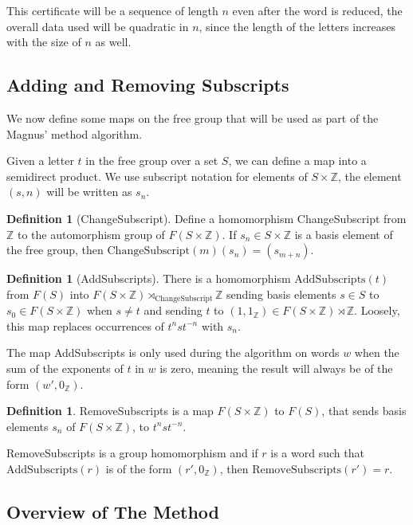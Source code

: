 \documentclass[12pt]{article} %
\theoremstyle{definition}
\theoremstyle{definition}
\theoremstyle{definition}
\theoremstyle{definition}
\newtheorem{defn}[thm]{Definition}
\begin{document}
This certificate will be a sequence of length $n$ even after the word is reduced,
the overall data used will be quadratic in $n$, since the length of the letters
increases with the size of $n$ as well.

\subsection{Adding and Removing Subscripts}

We now define some maps on the free group that will be used as part of the Magnus'
method algorithm.

Given a letter $t$ in the free group over a set $S$, we can define a map into a
semidirect product. We use subscript notation for elements of $S \times \mathbb{Z}$,
the element $(s, n)$ will be written as $s_n$.

\begin{defn}[ChangeSubscript]\label{csub}
  Define a homomorphism ChangeSubscript from $\mathbb{Z}$ to the automorphism
  group of $F(S \times \mathbb{Z})$. If $s_n \in S \times \mathbb{Z}$ is a basis
  element of the free group, then $\text{ChangeSubscript}(m)(s_n) = (s_{m+n})$.
\end{defn}

\begin{defn}[AddSubscripts]\label{AddSubscripts}
  There is a homomorphism $\text{AddSubscripts}(t)$ from $F(S)$ into $F(S \times \mathbb{Z})
  \rtimes_{\text{ChangeSubscript}} \mathbb{Z}$ sending basis elements $s \in S$ to
  $s_0 \in F(S \times \mathbb{Z})$ when $s \ne t$ and sending $t$ to
  $(1, 1_\mathbb{Z}) \in F(S \times \mathbb{Z}) \rtimes \mathbb{Z}$. Loosely, this map
  replaces occurrences of $t^n s t^{-n}$ with $s_n$.
\end{defn}

The map AddSubscripts is only used during the algorithm on words $w$ when the sum of the
exponents of $t$ in $w$ is zero, meaning the result will always be of the form
$(w', 0_{\mathbb{Z}})$.

\begin{defn}
  RemoveSubscripts is a map $F(S \times \mathbb{Z})$ to $F(S)$,
  that sends basis elements $s_n$ of $F(S\times \mathbb{Z})$,
  to $t^n s t^{-n}$.
\end{defn}
RemoveSubscripts is a group homomorphism and if $r$ is a word such that
$\text{AddSubscripts}(r)$ is of the form $(r', 0_\mathbb{Z})$,
then $\text{RemoveSubscripts}(r') = r$.

\subsection{Overview of The Method}
\end{document}
